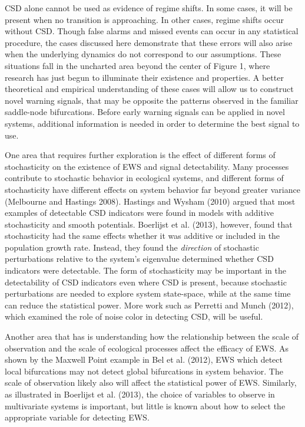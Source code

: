 \documentclass{article}
\begin{document}
CSD alone cannot be used as evidence of regime shifts. In some cases, it
will be present when no transition is approaching. In other cases,
regime shifts occur without CSD. Though false alarms and missed events
can occur in any statistical procedure, the cases discussed here
demonstrate that these errors will also arise when the underlying
dynamics do not correspond to our assumptions. These situations fall in
the uncharted area beyond the center of Figure 1, where research has
just begun to illuminate their existence and properties. A better
theoretical and empirical understanding of these cases will allow us to
construct novel warning signals, that may be opposite the patterns
observed in the familiar saddle-node bifurcations. Before early warning
signals can be applied in novel systems, additional information is
needed in order to determine the best signal to use.

One area that requires further exploration is the effect of different
forms of stochasticity on the existence of EWS and signal detectability.
Many processes contribute to stochastic behavior in ecological systems,
and different forms of stochasticity have different effects on system
behavior far beyond greater variance (Melbourne and Hastings 2008).
Hastings and Wysham (2010) argued that most examples of detectable CSD
indicators were found in models with additive stochasticity and smooth
potentials. Boerlijst et al. (2013), however, found that stochasticity
had the same effects whether it was additive or included in the
population growth rate. Instead, they found the \emph{direction} of
stochastic perturbations relative to the system's eigenvalue determined
whether CSD indicators were detectable. The form of stochasticity may be
important in the detectability of CSD indicators even where CSD is
present, because stochastic perturbations are needed to explore system
state-space, while at the same time can reduce the statistical power.
More work such as Perretti and Munch (2012), which examined the role of
noise color in detecting CSD, will be useful.

Another area that has is understanding how the relationship between the
scale of observation and the scale of ecological processes affect the
efficacy of EWS. As shown by the Maxwell Point example in Bel et al.
(2012), EWS which detect local bifurcations may not detect global
bifurcations in system behavior. The scale of observation likely also
will affect the statistical power of EWS. Similarly, as illustrated in
Boerlijst et al. (2013), the choice of variables to observe in
multivariate systems is important, but little is known about how to
select the appropriate variable for detecting EWS.
\end{document}
